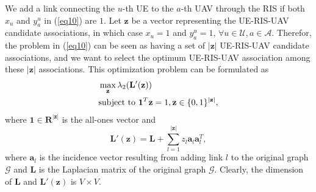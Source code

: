 \documentclass[conference]{IEEEtran}
\begin{document}
We add a link connecting the $u$-th UE to the $a$-th UAV through the RIS if both $x_u$ and $y^u_a$ in (\ref{eq10}) are $1$. Let $\mathbf z$ be a vector representing the UE-RIS-UAV candidate associations, in which case $x_u=1$ and $y^u_a=1$, $\forall u \in \mathcal U, a \in \mathcal A$. Therefor, the problem in (\ref{eq10}) can be seen as having a set of $|\mathbf z|$ UE-RIS-UAV candidate associations, and we want to select the optimum UE-RIS-UAV association among these
$|\mathbf z|$ associations. This optimization problem can be formulated as
\begin{align} 
&\max_{\mathbf z} \lambda_2(\mathbf L'(\mathbf z))
\label{eq10a} \\
& {\rm subject~to\ } \mathbf 1^T \mathbf z=1, \mathbf z \in \{0,1\}^{|\mathbf z|}, \nonumber
\end{align}
where $\mathbf 1 \in \mathbf R^{|\mathbf z|}$ is the all-ones vector and
\begin{equation}
\mathbf L'(\mathbf z)=\mathbf L+\sum^{|\mathbf z|}_{l=1} z_l \mathbf a_l \mathbf a^T_l,
\end{equation}
where $\mathbf a_l$ is the incidence vector resulting from adding link $l$ to the original graph $\mathcal G$ and $\mathbf L$ is the Laplacian matrix of the original graph $\mathcal G$. Clearly, the dimension of $\mathbf L$ and $\mathbf L'(\mathbf z)$ is $V \times V$. 
\end{document}
